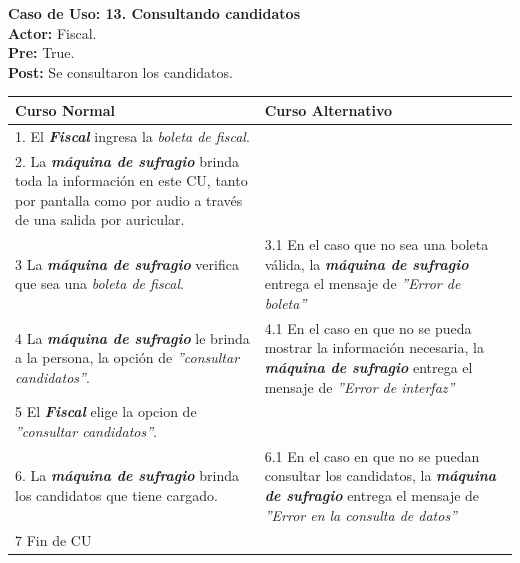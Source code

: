 \documentclass[spanish, 10pt,a4paper]{article}
\numberwithin{equation}{section} %
\begin{document}
\noindent\textbf{Caso de Uso: 13. Consultando candidatos}\\
\textbf{Actor: } Fiscal.\\
\textbf{Pre: } True.\\
\textbf{Post: } Se consultaron los candidatos.\\
\begin{table}[H]
  \centering
\bgroup
\def\arraystretch{1.3}
  \begin{tabular}{p{9cm} | p{7cm}}
    \hline
    Curso Normal & Curso Alternativo \\
    \hline
    \hline    
    1. El \textbf{\textit{Fiscal}} ingresa la \textit{boleta de fiscal}. 
    & \\
    
    \hline
    2. La \textbf{\textit{máquina de sufragio}} brinda toda la información en este CU, tanto por pantalla como por audio a través de una salida por auricular.
    &
    \\
    
    \hline
    3 La \textbf{\textit{máquina de sufragio}} verifica que sea una \textit{boleta de fiscal}.
    & 
    3.1 En el caso que no sea una boleta válida, la \textbf{\textit{máquina de sufragio}} entrega el mensaje de \textit{''Error de boleta''}
    \\
    
    \hline
    4 La \textbf{\textit{máquina de sufragio}} le brinda a la persona, la opción de \textit{''consultar candidatos''}.
    & 
    4.1 En el caso en que no se pueda mostrar la información necesaria, la \textbf{\textit{máquina de sufragio}} entrega el mensaje de \textit{''Error de interfaz''}
    \\
    
    \hline
    5 El \textbf{\textit{Fiscal}} elige la opcion de \textit{''consultar candidatos''}.
    & \\
    
    \hline
    6. La \textbf{\textit{máquina de sufragio}} brinda los candidatos que tiene cargado.
    &
    6.1 En el caso en que no se puedan consultar los candidatos, la \textbf{\textit{máquina de sufragio}} entrega el mensaje de \textit{''Error en la consulta de datos''}
    \\
    
    \hline
    7 Fin de CU
    & \\
    \hline
  \end{tabular}
\egroup
\end{table}
\end{document}
